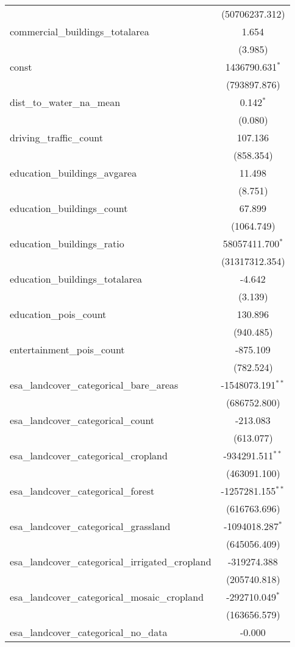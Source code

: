 \begin{table}[!htbp]
\begin{tabular}{@{\extracolsep{5pt}}lc}
  & (50706237.312) \\
 commercial_buildings_totalarea & 1.654$^{}$ \\
  & (3.985) \\
 const & 1436790.631$^{*}$ \\
  & (793897.876) \\
 dist_to_water_na_mean & 0.142$^{*}$ \\
  & (0.080) \\
 driving_traffic_count & 107.136$^{}$ \\
  & (858.354) \\
 education_buildings_avgarea & 11.498$^{}$ \\
  & (8.751) \\
 education_buildings_count & 67.899$^{}$ \\
  & (1064.749) \\
 education_buildings_ratio & 58057411.700$^{*}$ \\
  & (31317312.354) \\
 education_buildings_totalarea & -4.642$^{}$ \\
  & (3.139) \\
 education_pois_count & 130.896$^{}$ \\
  & (940.485) \\
 entertainment_pois_count & -875.109$^{}$ \\
  & (782.524) \\
 esa_landcover_categorical_bare_areas & -1548073.191$^{**}$ \\
  & (686752.800) \\
 esa_landcover_categorical_count & -213.083$^{}$ \\
  & (613.077) \\
 esa_landcover_categorical_cropland & -934291.511$^{**}$ \\
  & (463091.100) \\
 esa_landcover_categorical_forest & -1257281.155$^{**}$ \\
  & (616763.696) \\
 esa_landcover_categorical_grassland & -1094018.287$^{*}$ \\
  & (645056.409) \\
 esa_landcover_categorical_irrigated_cropland & -319274.388$^{}$ \\
  & (205740.818) \\
 esa_landcover_categorical_mosaic_cropland & -292710.049$^{*}$ \\
  & (163656.579) \\
 esa_landcover_categorical_no_data & -0.000$^{}$ \\

\end{tabular}
\end{table}
